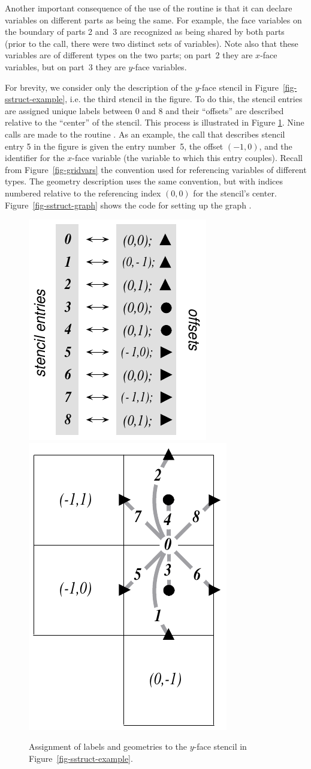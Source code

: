 Another important consequence of the use of the  routine
is that it can declare variables on different parts as being the same.  For
example, the face variables on the boundary of parts 2 and~3 are recognized as
being shared by both parts (prior to the  call, there
were two distinct sets of variables).  Note also that these variables are of
different types on the two parts; on part~2 they are $x$-face variables, but on
part~3 they are $y$-face variables.

For brevity, we consider only the description of the $y$-face stencil in
Figure~\ref{fig-sstruct-example}, i.e. the third stencil in the figure.  To do
this, the stencil entries are assigned unique labels between 0 and 8 and their
``offsets'' are described relative to the ``center'' of the stencil.  This
process is illustrated in Figure \ref{fig-sstruct-stencil}.  Nine calls are
made to the routine .  As an example, the
call that describes stencil entry 5 in the figure is given the entry number~5,
the offset $(-1,0)$, and the identifier for the $x$-face variable (the variable
to which this entry couples).  Recall from Figure~\ref{fig-gridvars} the
convention used for referencing variables of different types.  The geometry
description uses the same convention, but with indices numbered relative to the
referencing index $(0,0)$ for the stencil's center.
Figure~\ref{fig-sstruct-graph} shows the code for setting up the graph .

\begin{figure}
\centering
\mbox{}\hfill
\includegraphics[width=.25\textwidth]{figSStructStenc0}
\hfill
\includegraphics[width=.2\textwidth]{figSStructStenc1}
\hfill\mbox{}
\caption{%
Assignment of labels and geometries to the $y$-face stencil in
Figure~\ref{fig-sstruct-example}.}
\label{fig-sstruct-stencil}
\end{figure}

